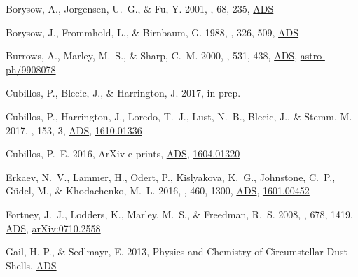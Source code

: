 \documentclass[tighten, times, twocolumn]{aastex61}  %
\newcommand{\eprint}[1]{\href{http://arxiv.org/abs/#1}{#1}}
\renewcommand{\eprint}[1]{\href{http://arxiv.org/abs/#1}{#1}}
\providecommand{\adsurl}[1]{\href{#1}{ADS}}
\begin{document}
\begin{thebibliography}{50}
{Borysow}, A., {Jorgensen}, U.~G., \& {Fu}, Y. 2001, \jqsrt, 68, 235,
  \adsurl{http://adsabs.harvard.edu/abs/2001JQSRT..68..235B}

{Borysow}, J., {Frommhold}, L., \& {Birnbaum}, G. 1988, \apj, 326, 509,
  \adsurl{http://adsabs.harvard.edu/abs/1988ApJ...326..509B}

{Burrows}, A., {Marley}, M.~S., \& {Sharp}, C.~M. 2000, \apj, 531, 438,
  \adsurl{http://adsabs.harvard.edu/abs/2000ApJ...531..438B},
  \eprint{astro-ph/9908078}

{Cubillos}, P., {Blecic}, J., \& {Harrington}, J. 2017{}, in prep.

{Cubillos}, P., {Harrington}, J., {Loredo}, T.~J., {Lust}, N.~B., {Blecic}, J.,
  \& {Stemm}, M. 2017{}, \aj, 153, 3,
  \adsurl{http://adsabs.harvard.edu/abs/2017AJ....153....3C},
  \eprint{1610.01336}

{Cubillos}, P.~E. 2016, ArXiv e-prints,
  \adsurl{http://adsabs.harvard.edu/abs/2016arXiv160401320C},
  \eprint{1604.01320}

{Erkaev}, N.~V., {Lammer}, H., {Odert}, P., {Kislyakova}, K.~G., {Johnstone},
  C.~P., {G{\"u}del}, M., \& {Khodachenko}, M.~L. 2016, \mnras, 460, 1300,
  \adsurl{http://adsabs.harvard.edu/abs/2016MNRAS.460.1300E},
  \eprint{1601.00452}

{Fortney}, J.~J., {Lodders}, K., {Marley}, M.~S., \& {Freedman}, R.~S. 2008,
  \apj, 678, 1419, \adsurl{http://adsabs.harvard.edu/abs/2008ApJ...678.1419F},
  \eprint{arXiv:0710.2558}

{Gail}, H.-P., \& {Sedlmayr}, E. 2013, {Physics and Chemistry of Circumstellar
  Dust Shells}, \adsurl{http://adsabs.harvard.edu/abs/2013pccd.book.....G}


\end{thebibliography}
\end{document}

